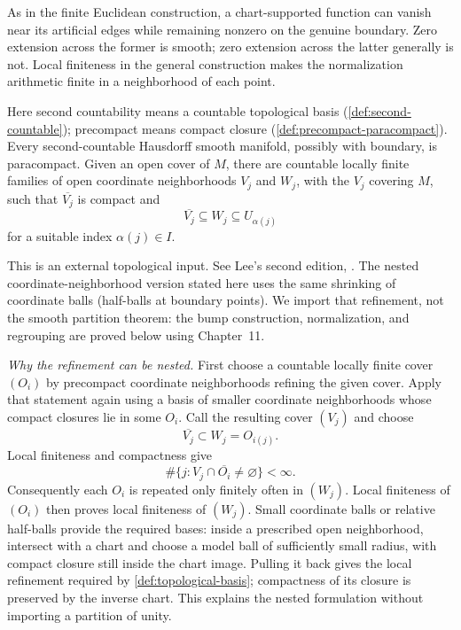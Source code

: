 As in the finite Euclidean construction, a chart-supported function can vanish near its artificial edges while
remaining nonzero on the genuine boundary. Zero extension across the former
is smooth; zero extension across the latter generally is not. Local
finiteness in the general construction makes the normalization arithmetic
finite in a neighborhood of each point.
\begin{center}
\end{center}
\begin{theorem}
\label{thm:manifold-refinement-external}
Here second countability means a countable topological basis
(\cref{def:second-countable}); precompact means compact closure
(\cref{def:precompact-paracompact}). Every second-countable Hausdorff
smooth manifold, possibly with boundary, is
paracompact.  Given an open cover of \(M\), there are countable locally finite
families of open coordinate neighborhoods \(V_j\) and \(W_j\), with the
\(V_j\) covering \(M\), such that
\(\overline{V_j}\) is compact and
\[
\overline{V_j}\subseteq W_j\subseteq U_{\alpha(j)}
\]
for a suitable index \(\alpha(j)\in I\).
\end{theorem}

This is an external topological input. See Lee's second edition,
\cite[Theorem~1.15 and the coordinate-ball refinement in the proof of
Theorem~2.23, pp.~43--44; boundary adaptation in Exercise~2.24]{lee-smooth}.
The nested coordinate-neighborhood version stated here uses the same
shrinking of coordinate balls (half-balls at boundary points). We import
that refinement, not the smooth partition theorem: the bump construction,
normalization, and regrouping are proved below using Chapter~11.

\emph{Why the refinement can be nested.} First choose a countable locally finite cover $(O_i)$ by precompact
coordinate neighborhoods refining the given cover. Apply that statement
again using a basis of
smaller coordinate neighborhoods whose compact closures lie in some $O_i$.
Call the resulting cover $(V_j)$ and choose
\[
\overline{V_j}\subset W_j=O_{i(j)}.
\]
Local finiteness and compactness give
\[
\#\{j:V_j\cap\overline{O_i}\ne\varnothing\}<\infty.
\]
Consequently each $O_i$ is repeated only finitely often in $(W_j)$.
Local finiteness of $(O_i)$ then proves local finiteness of $(W_j)$.
Small coordinate balls or relative half-balls provide the required bases:
inside a prescribed open neighborhood, intersect with a chart and choose
a model ball of sufficiently small radius, with compact closure still
inside the chart image. Pulling it back gives the local refinement required
by \cref{def:topological-basis}; compactness of its closure is preserved by
the inverse chart. This
explains the nested formulation without importing a partition of unity.

